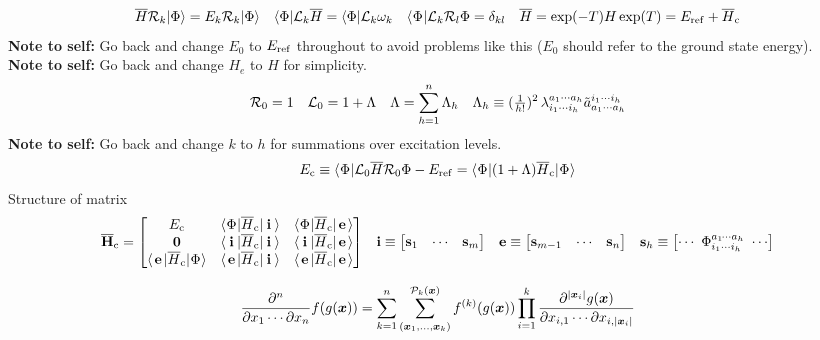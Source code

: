 \documentclass[11pt]{article}
\numberwithin{equation}{section}
\newcommand{\fwkt}[1]{\kt{\makebox[0.8em][c]{\ensuremath{#1}}}}
\newcommand{\fwbr}[1]{\br{\makebox[0.8em][c]{\ensuremath{#1}}}}
\begin{document}
\newpage
\begin{align}
  \ol{H}
  \mc{R}_k
  \kt{\F}
=
  E_k
  \mc{R}_k
  \kt{\F}
&&
  \br{\F}
  \mc{L}_k
  \ol{H}
=
  \br{\F}
  \mc{L}_k
  \w_k
&&
  \fwbr{\F}
    \mc{L}_k
    \mc{R}_l
  {\F}
=
  \d_{kl}
&&
  \ol{H}
=
  \mr{exp}(-T)
  H\,
  \mr{exp}(T)
=
  E_\mr{ref}
+
  \ol{H}_\mr{c}
\end{align}
\textbf{Note to self:}
Go back and change $E_0$ to $E_{\mathrm{ref}}$ throughout to avoid problems like this ($E_0$ should refer to the ground state energy).\\
\textbf{Note to self:}
Go back and change $H_e$ to $H$ for simplicity.
\begin{align}
  \mathcal{R}_0
=
  1
&&
  \mathcal{L}_0
=
  1
+
  \Lambda 
&&
  \Lambda 
=
  \sum_{h=1}^n
  \Lambda _h
&&
  \Lambda _h
\equiv
  (\tfrac{1}{h!})^2\,
  \lambda _{i_1\cdots i_h}^{a_1\cdots a_h}
  \tilde{a}^{i_1\cdots i_h}_{a_1\cdots a_h}
\end{align}
\textbf{Note to self:}
Go back and change $k$ to $h$ for summations over excitation levels.
\begin{align*}
  E_\mr{c}
\equiv
  \fwbr{\F}\mc{L}_0\ol{H}\mc{R}_0{\F}
-
  E_\mr{ref}
=
  \fwbr{\F}(1+\La)\ol{H}_\mr{c}\fwkt{\F}
\end{align*}
Structure of matrix
\begin{align*}
  \ol{\bo{H}}_\mr{c}
=
\pma{
  E_\mr{c} & \fwbr{\F}\ol{H}_\mr{c}\fwkt{\bo{i}} & \fwbr{\F}\ol{H}_\mr{c}\fwkt{\bo{e}} \\
  \bo{0} & \fwbr{\bo{i}}\ol{H}_\mr{c}\fwkt{\bo{i}} & \fwbr{\bo{i}}\ol{H}_\mr{c}\fwkt{\bo{e}} \\
  \fwbr{\bo{e}}\ol{H}_\mr{c}\fwkt{\F} & \fwbr{\bo{e}}\ol{H}_\mr{c}\fwkt{\bo{i}} & \fwbr{\bo{e}}\ol{H}_\mr{c}\fwkt{\bo{e}} \\
}
&&
  \bo{i}
\equiv
\pma{
  \bo{s}_1 & \cd & \bo{s}_m
}
&&
  \bo{e}
\equiv
\pma{
  \bo{s}_{m-1} & \cd & \bo{s}_n
}
&&
  \bo{s}_h
\equiv
\pma{
  \cd
\
  \F_{i_1\cd i_h}^{a_1\hspace{-1pt}\cd a_h}
\
  \cd
}
\end{align*}


\begin{thm}
\begin{align}
  \pd{^n}{x_1\cd \pt x_n}
  f(g(\bm{x}))
=
  \sum_{k=1}^n
  \sum_{(\bm{x}_1,\ld,\bm{x}_k)}^{\mc{P}_k(\bm{x})}
  f\ord{k}(g(\bm{x}))
  \prod_{i=1}^k
  \pd{
    ^{|\bm{x}_i|}
    g(\bm{x})
  }{
    x_{i,1}
  \cd
    \pt
    x_{i,|\bm{x}_i|}
  }
\end{align}
\end{thm}
\end{document}
